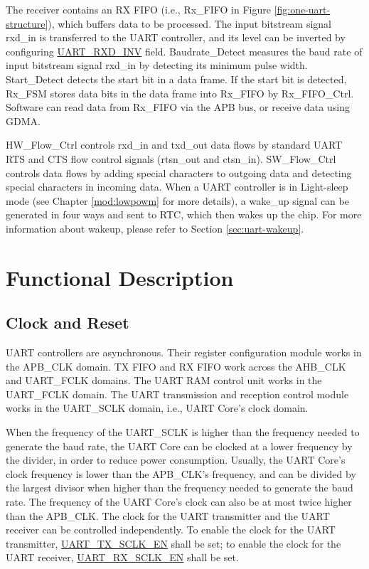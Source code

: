 \documentclass[main\_\_EN.tex]{subfiles}
\begin{document}
The receiver contains an RX FIFO (i.e., Rx\_FIFO in Figure \ref{fig:one-uart-structure}), which buffers data to be processed. The input bitstream signal rxd\_in is transferred to the UART controller, and its level can be inverted by configuring \hyperref[fielddesc:UARTRXDINV]{UART\_RXD\_INV} field. Baudrate\_Detect measures the baud rate of input bitstream signal rxd\_in by detecting its minimum pulse width. Start\_Detect detects the start bit in a data frame. If the start bit is detected, Rx\_FSM stores data bits in the data frame into Rx\_FIFO by Rx\_FIFO\_Ctrl. Software can read data from Rx\_FIFO via the APB bus, or receive data using GDMA.

HW\_Flow\_Ctrl controls rxd\_in and txd\_out data flows by standard UART RTS and CTS flow control signals (rtsn\_out and ctsn\_in). SW\_Flow\_Ctrl controls data flows by adding special characters to outgoing data and detecting special characters in incoming data. When a UART controller is in Light-sleep mode (see Chapter \ref{mod:lowpowm} \textit{} for more details), a wake\_up signal can be generated in four ways and sent to RTC, which then wakes up the \chipname{} chip. For more information about wakeup, please refer to Section \ref{sec:uart-wakeup}.

\section{Functional Description}

\subsection{Clock and Reset}

UART controllers are asynchronous. Their register configuration module works in the APB\_CLK domain. TX FIFO and RX FIFO work across the AHB\_CLK and UART\_FCLK domains. The UART RAM control unit works in the UART\_FCLK domain. The UART transmission and reception control module works in the UART\_SCLK domain, i.e., UART Core's clock domain.

When the frequency of the UART\_SCLK is higher than the frequency needed to generate the baud rate, the UART Core can be clocked at a lower frequency by the divider, in order to reduce power consumption. Usually, the UART Core's clock frequency is lower than the APB\_CLK's frequency, and can be divided by the largest divisor when higher than the frequency needed to generate the baud rate. The frequency of the UART Core's clock can also be at most twice higher than the APB\_CLK. The clock for the UART transmitter and the UART receiver can be controlled independently. To enable the clock for the UART transmitter, \hyperref[fielddesc:UARTTXSCLKEN]{UART\_TX\_SCLK\_EN} shall be set; to enable the clock for the UART receiver, \hyperref[fielddesc:UARTRXSCLKEN]{UART\_RX\_SCLK\_EN} shall be set.
\end{document}
